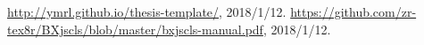 \begin{thebibliography}{9}
  \url{http://ymrl.github.io/thesis-template/},
  2018/1/12.
  \url{https://github.com/zr-tex8r/BXjscls/blob/master/bxjscls-manual.pdf},
  2018/1/12.
\end{thebibliography}
